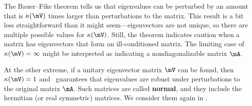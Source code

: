 
The Bauer--Fike theorem tells us that eigenvalues can be perturbed by an amount that is $\kappa(\mV)$ times larger than perturbations to the matrix. This result is a bit less straightforward than it might seem---eigenvectors are not unique, so there are multiple possible values for $\kappa(\mV)$. Still, the theorem indicates caution when a matrix has eigenvectors that form an ill-conditioned matrix. The limiting case of $\kappa(\mV)=\infty$ might be interpreted as indicating a nondiagonalizable matrix $\mA$.

At the other extreme, if a unitary eigenvector matrix $\mV$ can be found, then $\kappa(\mV)=1$ and~ guarantees that eigenvalues are robust under perturbations to the original matrix $\mA$. Such matrices are called  \textbf{normal}, and they include the hermitian (or real symmetric) matrices. We consider them again in .

